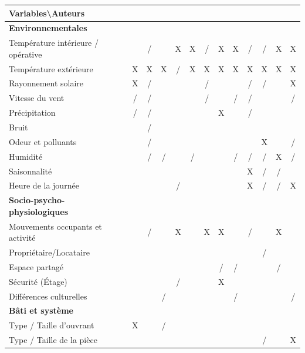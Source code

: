\begin{table} [H]
\centering
\begin{tabular}{|l||c|c|c|c|c|c|c|c|c|c|c|c|}
\hline
\textbf{Variables\textbackslash Auteurs} & \cite{Warren-84} & \cite{Fritsch-90} & \cite{Nicol-01} & \cite{Yun-08} & \cite{Rijal-08} & \cite{Herkel-08} & \cite{Haldi-09} & \cite{Schweiker-12} & \cite{Zhang-12} & \cite{Andersen-13} & \cite{Fabi-14} & \cite{d'Oca-14}\\
\hline
\hline \rowcolor{gray}\textbf{Environnementales} & \multicolumn{12}{c}{} \\
\hline Température intérieure / opérative &  & / &  & X & X & / & X & X & / & / & X & X \\
\hline Température extérieure & X & X & X & / & X & X & X & X & X & X & X & X \\
\hline Rayonnement solaire & X & / &  &  &  & / &  &  & / & / &  & X \\
\hline Vitesse du vent & / & / &  &  &  & / &  & / & / &  &  & / \\
\hline Précipitation & / & / &  &  &  &  & X &  & / &  &  &  \\
\hline Bruit &  & / &  &  &  &  &  &  &  &  &  &  \\
\hline Odeur et polluants &  & / &  &  &  &  &  &  &  & X &  & / \\
\hline Humidité &  & / & / &  & / &  &  & / & / & / & X & / \\
\hline Saisonnalité &  &  &  &  &  &  &  &  & X & / & / &  \\
\hline Heure de la journée &  &  &  & / &  &  &  &  & X & / & / & X \\
\hline \rowcolor{gray}\textbf{Socio-psycho-physiologiques} & \multicolumn{12}{c}{} \\
\hline Mouvements occupants et activité &  & / &  & X &  & X & X &  & / &  & X &  \\
\hline Propriétaire/Locataire &  &  &  &  &  &  &  &  &  & / &  &  \\
\hline Espace partagé &  &  &  &  &  &  & / & / &  &  & / &  \\
\hline Sécurité (Étage) &  &  &  & / &  &  & X &  &  &  &  &  \\
\hline Différences culturelles &  &  & / &  &  &  &  & / &  &  &  & / \\
\hline \rowcolor{gray}\textbf{Bâti et système} & \multicolumn{12}{c}{} \\
\hline Type / Taille d'ouvrant & X &  & / &  &  &  &  &  &  &  &  &  \\
\hline Type / Taille de la pièce &  &  &  &  &  &  &  &  &  & / &  & X \\

\end{tabular}
\end{table}
